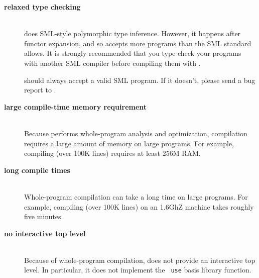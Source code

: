 
\newcommand{\drawback}[1]{\item[\bf #1]\hspace{1in}\\}

\begin{description}

\drawback{relaxed type checking}
{\mlton} does SML-style polymorphic type inference.  However, it
happens after functor expansion, and so {\mlton} accepts more programs
than the SML standard allows.  It is strongly recommended that you
type check your programs with another SML compiler before compiling
them with {\mlton}.

{\mlton} should always accept a valid SML program.  If it doesn't,
please send a bug report to {\mltonmail}.

\drawback{large compile-time memory requirement}
Because {\mlton} performs whole-program analysis and optimization,
compilation requires a large amount of memory on large programs.  For
example, compiling {\mlton} (over 100K lines) requires at least 256M
RAM.

\drawback{long compile times}
Whole-program compilation can take a long time on large programs.  For
example, compiling {\mlton} (over 100K lines) on an 1.6GhZ machine
takes roughly five minutes.

\drawback{no interactive top level}
Because of whole-program compilation, {\mlton} does not provide an
interactive top level.  In particular, it does not implement the {\tt
use} basis library function.

\end{description}
